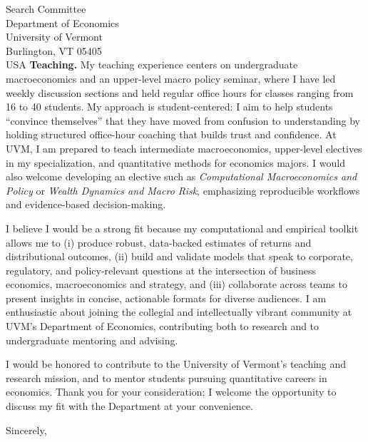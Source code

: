 \documentclass[11pt,letterpaper]{letter}
\begin{document}
\begin{letter}{Search Committee \\
Department of Economics \\
University of Vermont \\
Burlington, VT 05405 \\ USA}
\textbf{Teaching.} My teaching experience centers on undergraduate macroeconomics and an upper-level macro policy seminar, where I have led weekly discussion sections and held regular office hours for classes ranging from 16 to 40 students. My approach is student-centered: I aim to help students “convince themselves” that they have moved from confusion to understanding by holding structured office-hour coaching that builds trust and confidence. At UVM, I am prepared to teach intermediate macroeconomics, upper-level electives in my specialization, and quantitative methods for economics majors. I would also welcome developing an elective such as \textit{Computational Macroeconomics and Policy} or \textit{Wealth Dynamics and Macro Risk}, emphasizing reproducible workflows and evidence-based decision-making.

I believe I would be a strong fit because my computational and empirical toolkit allows me to (i) produce robust, data-backed estimates of returns and distributional outcomes, (ii) build and validate models that speak to corporate, regulatory, and policy-relevant questions at the intersection of business economics, macroeconomics and strategy, and (iii) collaborate across teams to present insights in concise, actionable formats for diverse audiences. I am enthusiastic about joining the collegial and intellectually vibrant community at UVM’s Department of Economics, contributing both to research and to undergraduate mentoring and advising.

I would be honored to contribute to the University of Vermont’s teaching and research mission, and to mentor students pursuing quantitative careers in economics. Thank you for your consideration; I welcome the opportunity to discuss my fit with the Department at your convenience.

\closing{Sincerely,}

\end{letter}
\end{document}
